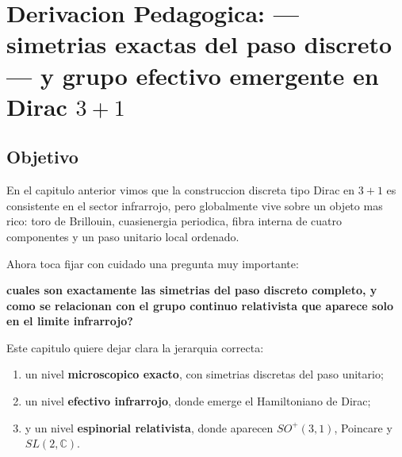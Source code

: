 \chapter{Derivacion Pedagogica: --- simetrias exactas del paso discreto --- y grupo efectivo emergente en Dirac \(3+1\)}
\label{ch:simetrias-grupo-paso-dirac}







\section{Objetivo}
En el capitulo anterior vimos que la construccion discreta tipo Dirac en \(3+1\) es consistente en el sector infrarrojo, pero globalmente vive sobre un objeto mas rico: toro de Brillouin, cuasienergia periodica, fibra interna de cuatro componentes y un paso unitario local ordenado.

Ahora toca fijar con cuidado una pregunta muy importante:
\begin{displayquote}
\textbf{cuales son exactamente las simetrias del paso discreto completo, y como se relacionan con el grupo continuo relativista que aparece solo en el limite infrarrojo?}
\end{displayquote}

Este capitulo quiere dejar clara la jerarquia correcta:
\begin{enumerate}[label=\arabic*.]
    \item un nivel \textbf{microscopico exacto}, con simetrias discretas del paso unitario;
    \item un nivel \textbf{efectivo infrarrojo}, donde emerge el Hamiltoniano de Dirac;
    \item y un nivel \textbf{espinorial relativista}, donde aparecen \(SO^+(3,1)\), Poincare y \(SL(2,\mathbb{C})\).
\end{enumerate}

